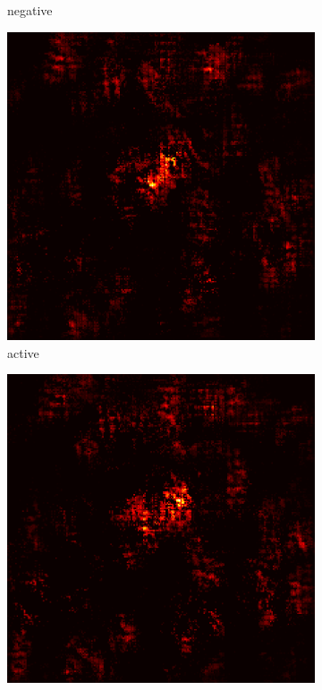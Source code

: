 \documentclass[preprint,12pt]{elsarticle}
\begin{document}
\begin{figure}
\begin{subfigure}{0.14\textwidth}
        \caption{negative}
    \end{subfigure}
    \hfill
    \begin{subfigure}{0.14\textwidth}
        \centering
        \includegraphics[width=\linewidth]{../visualizations/examples/imagenette/cnn/active_saliency_map/0.png}
        \caption{active}
    \end{subfigure}
    \hfill
    \begin{subfigure}{0.14\textwidth}
        \centering
        \includegraphics[width=\linewidth]{../visualizations/examples/imagenette/cnn/inactive_saliency_map/0.png}

\end{subfigure}
\end{figure}
\end{document}
